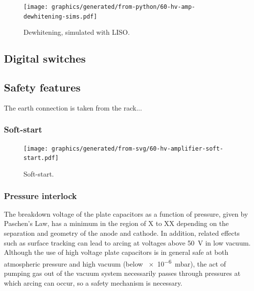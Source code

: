 \begin{figure}
  \centering
  \texttt{[image: graphics/generated/from-python/60-hv-amp-dewhitening-sims.pdf]}
  \caption[Simulated dewhitening filter frequency response]{Dewhitening, simulated with LISO.}
  \label{fig:hv-amp-dewhitening-sims}
\end{figure}

\subsection{Digital switches}

\subsection{Safety features}

The earth connection is taken from the rack...

\subsubsection{Soft-start}

\begin{figure}
  \centering
  \texttt{[image: graphics/generated/from-svg/60-hv-amplifier-soft-start.pdf]}
  \caption[High voltage amplifier soft-start schematic]{\label{fig:hv-amp-soft-start}Soft-start. }
\end{figure}

\subsubsection{Pressure interlock}

The breakdown voltage of the plate capacitors as a function of pressure, given by Paschen's Law, has a minimum in the region of X to XX depending on the separation and geometry of the anode and cathode. In addition, related effects such as surface tracking can lead to arcing at voltages above \SI{50}{\volt} in low vacuum. Although the use of high voltage plate capacitors is in general safe at both atmospheric pressure and high vacuum (below \SI{e-6}{\milli\bar}), the act of pumping gas out of the vacuum system necessarily passes through pressures at which arcing can occur, so a safety mechanism is necessary.

